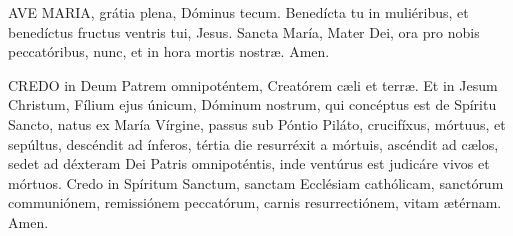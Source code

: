 \begin{multicols}{2}
{{\vfill{}

AVE MARIA, grátia plena, Dóminus tecum. Benedícta tu in muliéribus, et benedíctus fructus ventris tui, Jesus. Sancta María, Mater Dei, ora pro nobis peccatóribus, nunc, et in hora mortis nostræ. Amen.

\vfill{}

CREDO in Deum Patrem omnipoténtem, Creatórem cæli et terræ. Et in Jesum Christum, Fílium ejus únicum, Dóminum nostrum, qui concéptus est de Spíritu Sancto, natus ex María Vírgine, passus sub Póntio Piláto, crucifíxus, mórtuus, et sepúltus, descéndit ad ínferos, tértia die resurréxit a mórtuis, ascéndit ad cælos, sedet ad déxteram Dei Patris omnipoténtis, inde ventúrus est judicáre vivos et mórtuos. Credo in Spíritum Sanctum, sanctam Ecclésiam cathólicam, sanctórum communiónem, remissiónem peccatórum, carnis resurrectiónem, vitam ætérnam. Amen.
}
}
\end{multicols}

